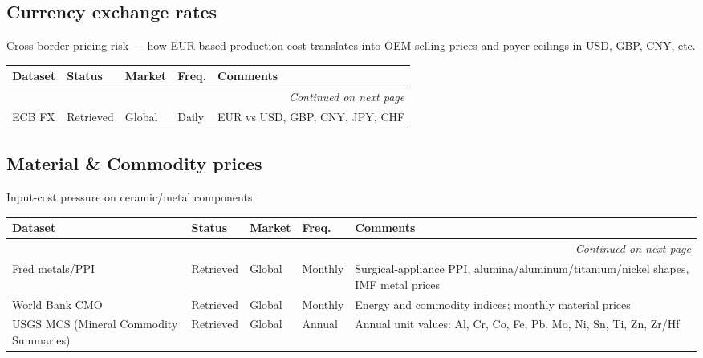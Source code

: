 \documentclass{article}
\begin{document}
\subsection{Currency exchange rates}
Cross-border pricing risk — how EUR-based production cost translates into OEM selling prices and payer ceilings in USD, GBP, CNY, etc.\\[0.5em]

\small
\setlength{\tabcolsep}{4pt}
\renewcommand{\arraystretch}{1.15}
\begin{longtable}{@{}p{3.0cm}p{2.0cm}p{2.1cm}p{1.9cm}p{5.8cm}@{}}
\toprule
\textbf{Dataset} & \textbf{Status} & \textbf{Market} & \textbf{Freq.} & \textbf{Comments} \\
\midrule
\endhead
\midrule
\multicolumn{5}{r}{\textit{Continued on next page}} \\
\endfoot
\bottomrule
\endlastfoot
ECB FX & \textcolor{green!60!black}{Retrieved} & Global & Daily & EUR vs USD, GBP, CNY, JPY, CHF \\
\end{longtable}
\normalsize

\subsection{Material \& Commodity prices}
Input-cost pressure on ceramic/metal components\\[0.5em]

\small
\setlength{\tabcolsep}{4pt}
\renewcommand{\arraystretch}{1.15}
\begin{longtable}{@{}p{3.0cm}p{2.0cm}p{2.1cm}p{1.9cm}p{5.8cm}@{}}
\toprule
\textbf{Dataset} & \textbf{Status} & \textbf{Market} & \textbf{Freq.} & \textbf{Comments} \\
\midrule
\endhead
\midrule
\multicolumn{5}{r}{\textit{Continued on next page}} \\
\endfoot
\bottomrule
\endlastfoot
Fred metals/PPI & \textcolor{green!60!black}{Retrieved} & Global & Monthly & Surgical-appliance PPI, alumina/aluminum/titanium/nickel shapes, IMF metal prices \\
World Bank CMO & \textcolor{green!60!black}{Retrieved} & Global & Monthly & Energy and commodity indices; monthly material prices \\
USGS MCS (Mineral Commodity Summaries) & \textcolor{green!60!black}{Retrieved} & Global & Annual & Annual unit values: Al, Cr, Co, Fe, Pb, Mo, Ni, Sn, Ti, Zn, Zr/Hf \\
\end{longtable}
\normalsize
\end{document}
